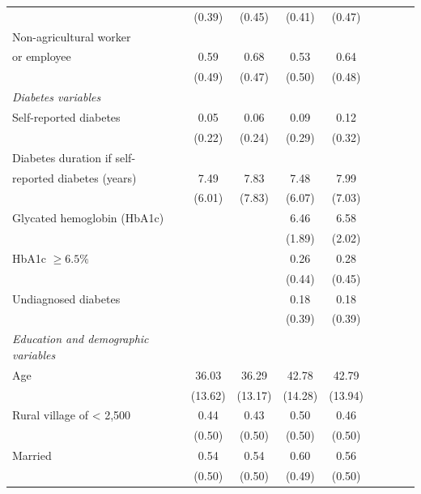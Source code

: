 \begin{table}[p]
\begin{adjustbox}{max width=\linewidth, center}
\begin{threeparttable}
{\begin{tabular}{l*{4}{SS}}
                    &      (0.39)&      (0.45)&      (0.41)&      (0.47)\\
Non-agricultural worker &&&&\\
or employee& 0.59&        0.68&        0.53&        0.64\\
                    &      (0.49)&      (0.47)&      (0.50)&      (0.48)\\
\hspace*{10mm}\emph{Diabetes variables} \\
Self-reported diabetes  &         0.05&        0.06&        0.09&        0.12\\
                    &      (0.22)&      (0.24)&      (0.29)&      (0.32)\\
Diabetes duration if self- &&&&\\
reported diabetes (years)   &        7.49&        7.83&        7.48&        7.99\\
                    &      (6.01)&      (7.83)&      (6.07)&      (7.03)\\
Glycated hemoglobin (HbA1c)&            &            &       6.46&        6.58\\
                    &            &            &      (1.89)&      (2.02)\\
HbA1c $\geq 6.5\%$  &            &            &        0.26&        0.28\\
                    &            &            &      (0.44)&      (0.45)\\
Undiagnosed diabetes&            &            &        0.18&        0.18\\
                    &            &            &      (0.39)&      (0.39)\\
\hspace*{10mm}\emph{Education and demographic variables} \\
Age                 &       36.03&       36.29&       42.78&       42.79\\
                    &     (13.62)&     (13.17)&     (14.28)&     (13.94)\\
Rural village of < 2,500&        0.44&        0.43&        0.50&        0.46\\
                    &      (0.50)&      (0.50)&      (0.50)&      (0.50)\\
Married             &        0.54&        0.54&        0.60&        0.56\\
                    &      (0.50)&      (0.50)&      (0.49)&      (0.50)\\

\end{tabular}}
\end{threeparttable}
\end{adjustbox}
\end{table}
